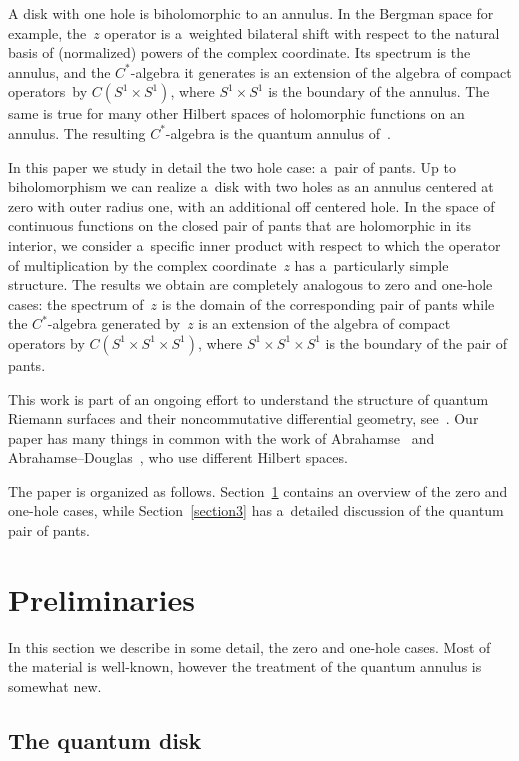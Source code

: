 \documentclass[pdftex]{sigma}
\numberwithin{equation}{section}
\begin{document}
A disk with one hole is biholomorphic to an annulus.
In the Bergman space for example, the~$z$ operator is a~weighted bilateral shift with respect to the natural basis of
(normalized) powers of the complex coordinate.
Its spectrum is the annulus, and the $C^*$-algebra it generates is an extension of the algebra of compact operators~by
$C(S^1\times S^1)$, where $S^1\times S^1$ is the boundary of the annulus.
The same is true for many other Hilbert spaces of holomorphic functions on an annulus.
The resulting $C^*$-algebra is the quantum annulus of~\cite{KL3,KM1}.

In this paper we study in detail the two hole case: a~pair of pants.
Up to biholomorphism we can realize a~disk with two holes as an annulus centered at zero with outer radius one, with an
additional of\/f centered hole.
In the space of continuous functions on the closed pair of pants that are holomorphic in its interior, we consider
a~specif\/ic inner product with respect to which the operator of multiplication by the complex coordinate~$z$ has
a~particularly simple structure.
The results we obtain are completely analogous to zero and one-hole cases: the spectrum of~$z$ is the domain of the
corresponding pair of pants while the $C^*$-algebra generated by~$z$ is an extension of the algebra of compact operators
by $C(S^1\times S^1\times S^1)$, where $S^1\times S^1\times S^1$ is the boundary of the pair of pants.

This work is part of an ongoing ef\/fort to understand the structure of quantum Riemann surfaces and their noncommutative
dif\/ferential geometry, see~\cite{KL, KL1, KL3, KL4, KM1, KM2,KM3,KM4}.
Our paper has many things in common with the work of Abrahamse~\cite{Abr} and Abrahamse--Douglas~\cite{AD}, who use
dif\/ferent Hilbert spaces.

The paper is organized as follows.
Section~\ref{section2} contains an overview of the zero and one-hole cases, while Section~\ref{section3} has a~detailed
discussion of the quantum pair of pants.

\section{Preliminaries}\label{section2}
In this section we describe in some detail, the zero and one-hole cases.
Most of the material is well-known, however the treatment of the quantum annulus is somewhat new.

\subsection{The quantum disk}
\end{document}
